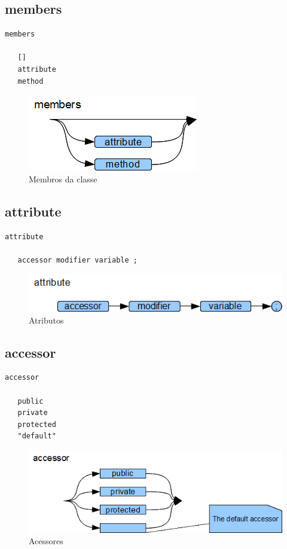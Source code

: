 \subsection{members}

\begin{lstlisting}
members

   []
   attribute
   method

\end{lstlisting}

\begin{figure}[h!]
 \centering
 \includegraphics{capitulo09/members.png}
 \caption{Membros da classe}
\end{figure}
\subsection{attribute}

\begin{lstlisting}
attribute

   accessor modifier variable ;

\end{lstlisting}

\begin{figure}[h!]
 \centering
 \includegraphics{capitulo09/attribute.png}
 \caption{Atributos}
\end{figure}
\subsection{accessor}

\begin{lstlisting}
accessor

   public
   private
   protected
   "default"

\end{lstlisting}

\begin{figure}[h!]
 \centering
 \includegraphics{capitulo09/accessor.png}
 \caption{Acessores}
\end{figure}
